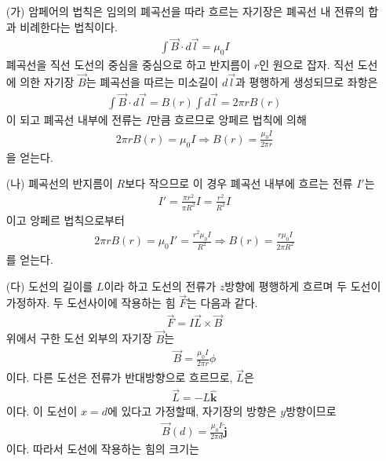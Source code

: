 \documentclass[tightenlines,floatfix,nofootinbib,superscriptaddress,fleqn]{revtex4}
\begin{document}
\begin{itemize}
  \item[(가)]
  암페어의 법칙은 임의의 폐곡선을 따라 흐르는 자기장은 폐곡선 내 전류의 합과 비례한다는 
  법칙이다.
  \begin{align}
    \int \vec{B}\cdot d\vec{l} = \mu_0 I
  \end{align}
  폐곡선을 직선 도선의 중심을 중심으로 하고 반지름이 $r$인 원으로 잡자. 직선 도선에 의한 
  자기장 $\vec{B}$는 폐곡선을 따르는 미소길이 $d\vec{l}$과 평행하게 생성되므로 좌항은
  \begin{align}
    \int \vec{B}\cdot d\vec{l} =B(r)\int d\vec{l} = 2\pi r B(r)
  \end{align}
  이 되고 폐곡선 내부에 전류는 $I$만큼 흐르므로 앙페르 법칙에 의해
  \begin{align}
  2\pi r B(r) = \mu_0 I\Longrightarrow B(r) = \frac{\mu_0 I}{2\pi r}
  \end{align}
  을 얻는다.
  \item[(나)]
  폐곡선의 반지름이 $R$보다 작으므로 이 경우 폐곡선 내부에 흐르는 전류 $I'$는 
  \begin{align}
    I' = \frac{\pi r^2}{\pi R^2} I = \frac{r^2}{R^2} I
  \end{align}
  이고 앙페르 법칙으로부터
  \begin{align}
    2\pi r B(r) = \mu_0 I' = \frac{r^2\mu_0 I}{R^2}
    \Longrightarrow B(r) = \frac{r\mu_0 I}{2\pi R^2}
  \end{align}
  를 얻는다.
  \item[(다)]
  도선의 길이를 $L$이라 하고 도선의 전류가 $z$방향에 평행하게 흐르며 두 도선이 가정하자.
  두 도선사이에 작용하는 힘 $\vec{F}$는 다음과 같다.
  \begin{align}
    \vec{F}=I\vec{L}\times \vec{B}
  \end{align}
  위에서 구한 도선 외부의 자기장 $\vec{B}$는
  \begin{align}
    \vec{B} = \frac{\mu_0 I}{2\pi r}\hat{\phi}
  \end{align}
  이다. 다른 도선은 전류가 반대방향으로 흐르므로, $\vec{L}$은
  \begin{align}
    \vec{L}=-L\hat{\bm{k}}
  \end{align}
  이다. 이 도선이 $x=d$에 있다고 가정할때, 자기장의 방향은
  $y$방향이므로
  \begin{align}
    \vec{B}(d)= \frac{\mu_0 I}{2\pi d}\hat{\bm{j}}
  \end{align}
  이다. 따라서 도선에 작용하는 힘의 크기는
  \begin{align}

\end{align}
\end{itemize}
\end{document}
